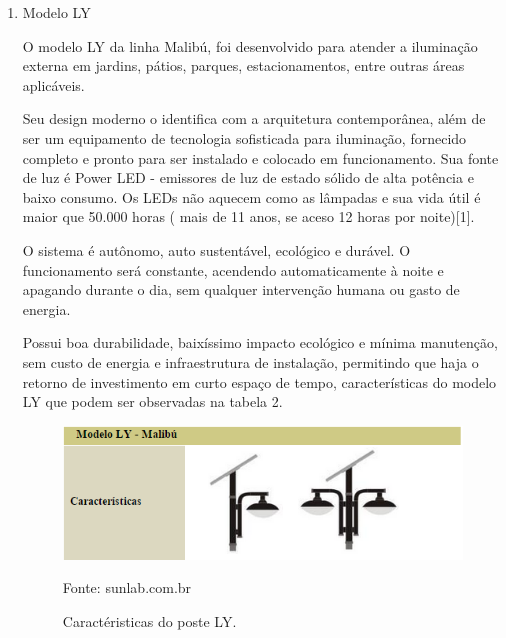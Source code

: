 \begin{enumerate}
	\item Modelo LY
	
	  O modelo  LY  da linha Malibú, foi desenvolvido para atender a iluminação externa em jardins, pátios, parques, estacionamentos, entre outras áreas aplicáveis.
	  
	Seu design moderno o identifica com a arquitetura contemporânea, além de ser um equipamento de tecnologia sofisticada para iluminação, fornecido completo e pronto para ser instalado e colocado em funcionamento. Sua fonte de luz é Power LED - emissores de luz de estado sólido de alta potência e baixo consumo. Os LEDs não aquecem como as lâmpadas e sua vida útil é maior que 50.000 horas ( mais de 11 anos, se aceso 12 horas por noite)[1].
    
    O sistema é autônomo, auto sustentável, ecológico e durável. O funcionamento será constante, acendendo automaticamente à noite e apagando durante o dia, sem qualquer intervenção humana ou gasto de energia.
    
    Possui boa durabilidade, baixíssimo impacto ecológico e mínima manutenção, sem custo de energia e infraestrutura de instalação, permitindo que haja o retorno de investimento em curto espaço de tempo, características do modelo LY  que podem ser observadas na tabela 2.

	\begin{figure}[H]
	 \centering
	\label{Caractéristicas do poste LY}
	 \includegraphics[keepaspectratio=true,scale=0.8]{postes/tabelaLY.png}
	 \caption{Caractéristicas do poste LY.}
	 \small{Fonte: sunlab.com.br}
	\end{figure}



\end{enumerate}
